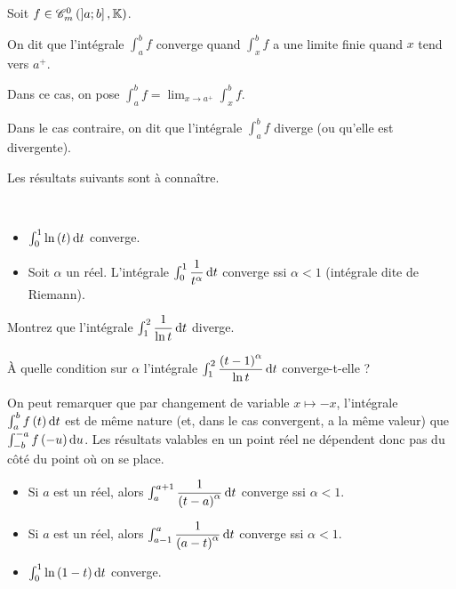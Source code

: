 \begin{defi}
Soit \(f\in\contm[\intervei{a}{b}]\).

On dit que l'intégrale \(\int_a^bf\) converge quand \(\int_x^bf\) a une limite finie quand \(x\) tend vers \(a^+\).

Dans ce cas, on pose \(\int_a^bf=\lim_{x\to a^+}\int_x^bf\).

Dans le cas contraire, on dit que l'intégrale \(\int_a^bf\) diverge (ou qu'elle est divergente).
\end{defi}

Les résultats suivants sont à connaître.

\begin{ex}~\\
\begin{itemize}
    \item \(\int_0^1\ln\paren{t}\odif{t}\) converge. \\
    \item Soit \(\alpha\) un réel. L'intégrale \(\int_0^1\dfrac{1}{t^\alpha}\odif{t}\) converge ssi \(\alpha<1\) (intégrale dite de Riemann).
\end{itemize}
\end{ex}

\begin{exo}
Montrez que l'intégrale \(\int_1^2\dfrac{1}{\ln t}\odif{t}\) diverge.

À quelle condition sur \(\alpha\) l'intégrale \(\int_1^2\dfrac{\paren{t-1}^\alpha}{\ln t}\odif{t}\) converge-t-elle ?
\end{exo}

On peut remarquer que par changement de variable \(x\mapsto-x\), l'intégrale \(\int_a^bf\paren{t}\odif{t}\) est de même nature (et, dans le cas convergent, a la même valeur) que \(\int_{-b}^{-a}f\paren{-u}\odif{u}\). Les résultats valables en un point réel ne dépendent donc pas du côté du point où on se place.

\begin{ex}
\begin{itemize}
    \item Si \(a\) est un réel, alors \(\int_a^{a+1}\dfrac{1}{\paren{t-a}^\alpha}\odif{t}\) converge ssi \(\alpha<1\). \\
    \item Si \(a\) est un réel, alors \(\int_{a-1}^a\dfrac{1}{\paren{a-t}^\alpha}\odif{t}\) converge ssi \(\alpha<1\). \\
    \item \(\int_0^1\ln\paren{1-t}\odif{t}\) converge.
\end{itemize}
\end{ex}


